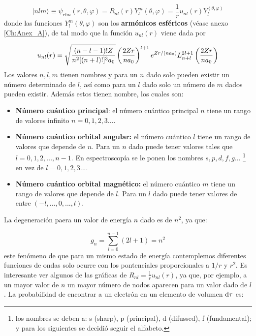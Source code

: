 \begin{equation}
|n l m \rangle \equiv \psi_{rlm} (r,\theta,\varphi) = R_{nl} (r) Y_l^m (\theta,\varphi) = \frac{1}{r} u_{nl} (r) Y_l^ (\theta,\varphi)
\end{equation}
donde las funciones $Y_l^m (\theta,\varphi)$ son los \textbf{armónicos esféricos} (véase anexo \ref{Ch:Anex_A}), de tal modo que la función $u_{nl} (r)$ viene dada por

\begin{equation}
    u_{nl} (r) = \sqrt{\frac{(n-l-1)! Z}{n^2 [(n+l)!]^3a_0}} \left( \frac{2Zr}{na_0} \right)^{l+1} e^{Zr/(na_0)} L_{n+l}^{2l+1} \left( \frac{2Zr}{na_0} \right)
\end{equation}
Los valores $n,l,m$ tienen nombres y para un $n$ dado solo pueden existir un número determinado de $l$, así como para un $l$ dado solo un número de $m$ dados pueden existir. Además estos tienen nombre, los cuales son:

\begin{itemize}
    \item \textbf{Número cuántico principal}: el número cuántico principal $n$ tiene un rango de valores infinito $n=0,1,2,3...$. 
    \item \textbf{Número cuántico orbital angular:} el número cuántico $l$ tiene un rango de valores que depende de $n$. Para un $n$ dado puede tener valores tales que $l=0,1,2,...,n-1$. En espectroscopía se le ponen los nombres $s,p,d,f,g...$ \footnote{los nombres se deben a: s (sharp), p (principal), d (difussed), f (fundamental); y para los siguientes se decidió seguir el alfabeto.} en vez de $l=0,1,2,3...$.
    \item \textbf{Número cuántico orbital magnético:} el número cuántico $m$ tiene un rango de valores que depende de $l$. Para un $l$ dado puede tener valores de entre $(-l,...,0,...,l)$.
\end{itemize}
La degeneración paera un valor de energía $n$ dado es de $n^2$, ya que:

\begin{equation}    
    g_n = \sum_{l=0}^{n-1} (2l+1) = n^2
\end{equation}
este fenómeno de que para un mismo estado de energía contemplemos diferentes funciones de ondas solo ocurre con los pontenciales proporcionales a $1/r$ y $r^2$. Es interesante ver algunos de las gráficas de $R_{nl} = \frac{1}{r} u_{nl} (r)$, ya que, por ejemplo, a un mayor valor de $n$ un mayor número de nodos aparecen para un valor dado de $l$. La probabilidad de encontrar a un electrón en un elemento de volumen $\mathrm{d} \tau$ es:

